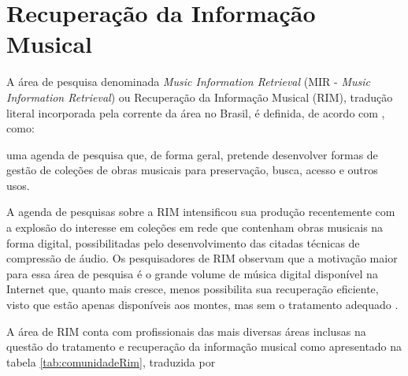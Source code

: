 \section{Recuperação da Informação Musical}

A área de pesquisa denominada \textit{Music Information Retrieval} (MIR - \textit{Music Information Retrieval}) ou Recuperação da Informação Musical (RIM), tradução literal incorporada pela corrente da área no Brasil, é definida, de acordo com , como:

\begin{citacao}
[...] uma agenda de pesquisa que, de forma geral, pretende desenvolver formas de gestão de coleções de obras musicais para preservação, busca, acesso e outros usos.
\end{citacao}

A agenda de pesquisas sobre a RIM intensificou sua produção recentemente com a explosão do interesse em coleções em rede que contenham obras musicais na forma digital, possibilitadas pelo desenvolvimento das citadas técnicas de compressão de áudio. Os pesquisadores de RIM observam que a motivação maior para essa área de pesquisa é o grande volume de música digital disponível na Internet que, quanto mais cresce, menos possibilita sua recuperação eficiente, visto que estão apenas disponíveis aos montes, mas sem o tratamento adequado \cite{gomes2015}.

A área de RIM conta com profissionais das mais diversas áreas inclusas na questão do tratamento e recuperação da informação musical como apresentado na tabela \ref{tab:comunidadeRim}, traduzida por 

